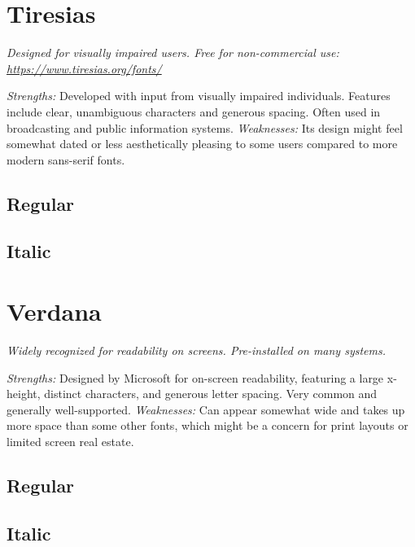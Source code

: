 \begin{raggedright}
\pagebreak
\section{Tiresias}\label{sec:tiresias}
\emph{Designed for visually impaired users. Free for non-commercial use: \url{https://www.tiresias.org/fonts/}}
\begin{raggedright}
\emph{Strengths:} Developed with input from visually impaired individuals. Features include clear, unambiguous characters and generous spacing. Often used in broadcasting and public information systems.
\emph{Weaknesses:} Its design might feel somewhat dated or less aesthetically pleasing to some users compared to more modern sans-serif fonts.

\subsection{Regular}
\FontSample{\tiresiasfont}

\subsection{Italic}
\FontSample{{\tiresiasfont\itshape}}
\end{raggedright}


\pagebreak
\section{Verdana}\label{sec:verdana}
\emph{Widely recognized for readability on screens. Pre-installed on many systems.}
\begin{raggedright}
\emph{Strengths:} Designed by Microsoft for on-screen readability, featuring a large x-height, distinct characters, and generous letter spacing. Very common and generally well-supported.
\emph{Weaknesses:} Can appear somewhat wide and takes up more space than some other fonts, which might be a concern for print layouts or limited screen real estate.

\subsection{Regular}
\FontSample{\verdanafont}

\subsection{Italic}
\FontSample{{\verdanafont\itshape}}
\end{raggedright}





\end{raggedright}
